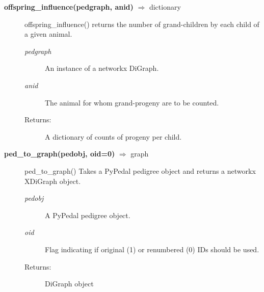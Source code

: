 \begin{description}
\item[\textbf{offspring\_influence(pedgraph, anid)} $\Rightarrow$ dictionary]
offspring\_influence() returns the number of grand-children by each child of a given animal.
\begin{description}
\item[\emph{pedgraph}] An instance of a networkx DiGraph.
\item[\emph{anid}] The animal for whom grand-progeny are to be counted.
\item[Returns:] A dictionary of counts of progeny per child.
\end{description}

\item[\textbf{ped\_to\_graph(pedobj, oid=0)} $\Rightarrow$ graph]
ped\_to\_graph() Takes a PyPedal pedigree object and returns a networkx XDiGraph object.
\begin{description}
\item[\emph{pedobj}] A PyPedal pedigree object.
\item[\emph{oid}] Flag indicating if original (1) or renumbered (0) IDs should be used.
\item[Returns:] DiGraph object
\end{description}

\end{description}